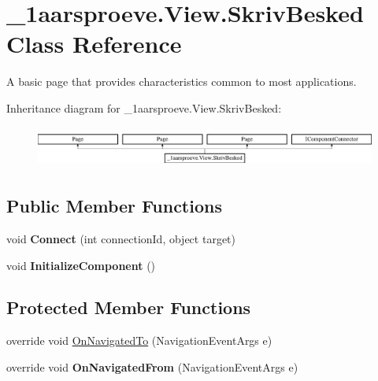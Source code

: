 \hypertarget{class__1aarsproeve_1_1_view_1_1_skriv_besked}{}\section{\+\_\+1aarsproeve.\+View.\+Skriv\+Besked Class Reference}
\label{class__1aarsproeve_1_1_view_1_1_skriv_besked}


A basic page that provides characteristics common to most applications.  


Inheritance diagram for \+\_\+1aarsproeve.\+View.\+Skriv\+Besked\+:\begin{figure}[H]
\begin{center}
\leavevmode
\includegraphics[height=1.365854cm]{class__1aarsproeve_1_1_view_1_1_skriv_besked}
\end{center}
\end{figure}
\subsection*{Public Member Functions}
\begin{DoxyCompactItemize}
\item 
\hypertarget{class__1aarsproeve_1_1_view_1_1_skriv_besked_ae9f6ee3a3c0a435a52b6775f6d50652e}{}void {\bfseries Connect} (int connection\+Id, object target)\label{class__1aarsproeve_1_1_view_1_1_skriv_besked_ae9f6ee3a3c0a435a52b6775f6d50652e}

\item 
\hypertarget{class__1aarsproeve_1_1_view_1_1_skriv_besked_a765af0a076e2e07eb3dedf725247aaa1}{}void {\bfseries Initialize\+Component} ()\label{class__1aarsproeve_1_1_view_1_1_skriv_besked_a765af0a076e2e07eb3dedf725247aaa1}

\end{DoxyCompactItemize}
\subsection*{Protected Member Functions}
\begin{DoxyCompactItemize}
\item 
override void \hyperlink{class__1aarsproeve_1_1_view_1_1_skriv_besked_ab0c5a22e91f5f089078bd5e4c1f9cdfe}{On\+Navigated\+To} (Navigation\+Event\+Args e)
\item 
\hypertarget{class__1aarsproeve_1_1_view_1_1_skriv_besked_a4aac18ef6aef2d31b964c778dd4f0f91}{}override void {\bfseries On\+Navigated\+From} (Navigation\+Event\+Args e)\label{class__1aarsproeve_1_1_view_1_1_skriv_besked_a4aac18ef6aef2d31b964c778dd4f0f91}

\end{DoxyCompactItemize}
